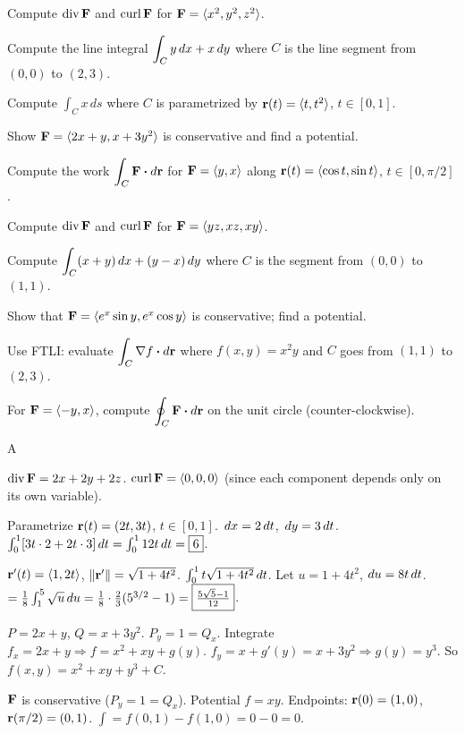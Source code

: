 \documentclass[11pt]{article}
\begin{document}
\begin{problems}
\item Compute $\operatorname{div} \mathbf{F}$ and $\operatorname{curl} \mathbf{F}$ for $\mathbf{F} = \langle x^2, y^2, z^2\rangle$.
\item Compute the line integral $\displaystyle \int_C y \,dx + x \,dy$ where $C$ is the line segment from $(0,0)$ to $(2,3)$.
\item Compute $\displaystyle \int_C x \, ds$ where $C$ is parametrized by $\mathbf{r}(t) = \langle t, t^2\rangle$, $t \in [0, 1]$.
\item Show $\mathbf{F} = \langle 2x + y, x + 3y^2\rangle$ is conservative and find a potential.
\item Compute the work $\displaystyle \int_C \mathbf{F} \boldsymbol\cdot d\mathbf{r}$ for $\mathbf{F} = \langle y, x\rangle$ along $\mathbf{r}(t) = \langle \cos t, \sin t\rangle$, $t \in [0, \pi/2]$.
\end{problems}

\vfill
\newpage
{}
\begin{problems}
\item Compute $\operatorname{div} \mathbf{F}$ and $\operatorname{curl} \mathbf{F}$ for $\mathbf{F} = \langle yz, xz, xy\rangle$.
\item Compute $\displaystyle \int_C (x + y) \,dx + (y - x) \,dy$ where $C$ is the segment from $(0,0)$ to $(1,1)$.
\item Show that $\mathbf{F} = \langle e^x \sin y, e^x \cos y\rangle$ is conservative; find a potential.
\item Use FTLI: evaluate $\displaystyle \int_C \nabla f \boldsymbol\cdot d\mathbf{r}$ where $f(x,y) = x^2 y$ and $C$ goes from $(1,1)$ to $(2,3)$.
\item For $\mathbf{F} = \langle -y, x\rangle$, compute $\displaystyle \oint_C \mathbf{F} \boldsymbol\cdot d\mathbf{r}$ on the unit circle (counter-clockwise).
\end{problems}

\vfill
\newpage
{}

\begin{answers}{A}
\item $\operatorname{div} \mathbf{F} = 2x + 2y + 2z$. $\operatorname{curl} \mathbf{F} = \langle 0, 0, 0\rangle$ (since each component depends only on its own variable).
\item Parametrize $\mathbf{r}(t) = (2t, 3t)$, $t \in [0,1]$. $\,dx = 2 \,dt$, $\,dy = 3 \,dt$. $\int_0^1 [3t \cdot 2 + 2t \cdot 3] \,dt = \int_0^1 12 t \,dt = \boxed{6}$.
\item $\mathbf{r}'(t) = \langle 1, 2t\rangle$, $\|\mathbf{r}'\| = \sqrt{1+4t^2}$. $\int_0^1 t \sqrt{1+4t^2} \,dt$. Let $u = 1+4t^2$, $du = 8t \,dt$. $= \tfrac{1}{8}\int_1^5 \sqrt u \,du = \tfrac{1}{8} \cdot \tfrac{2}{3}(5^{3/2} - 1) = \boxed{\tfrac{5\sqrt 5 - 1}{12}}$.
\item $P = 2x + y$, $Q = x + 3y^2$. $P_y = 1 = Q_x$. \checkmark Integrate $f_x = 2x + y \Rightarrow f = x^2 + xy + g(y)$. $f_y = x + g'(y) = x + 3y^2 \Rightarrow g(y) = y^3$. So $\boxed{f(x,y) = x^2 + xy + y^3 + C}$.
\item $\mathbf{F}$ is conservative ($P_y = 1 = Q_x$). Potential $f = xy$. Endpoints: $\mathbf{r}(0) = (1,0)$, $\mathbf{r}(\pi/2) = (0,1)$. $\int = f(0,1) - f(1,0) = 0 - 0 = \boxed{0}$.
\end{answers}
\end{document}
